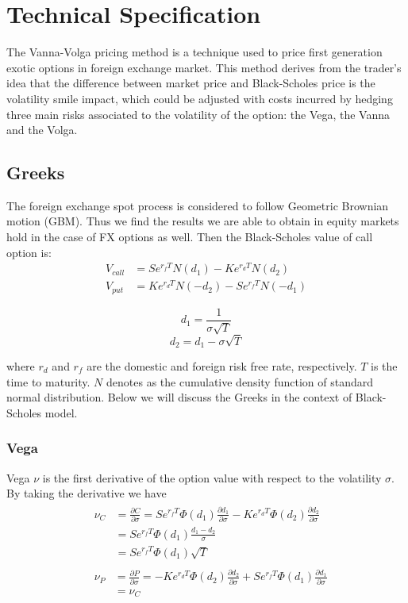 \chapter{Technical Specification}

The Vanna-Volga pricing method is a technique used to price first generation exotic options in foreign exchange market. This method derives from the trader's idea that the difference between market price and Black-Scholes price is the volatility smile impact, which could be adjusted with costs incurred by hedging three main risks associated to the volatility of the option: the Vega, the Vanna and the Volga.

\section{Greeks} 
The foreign exchange spot process is considered to follow Geometric Brownian motion (GBM). Thus we find the results we are able to obtain in equity markets hold in the case of FX options as well. \newline
Then the Black-Scholes value of call option is:
\begin{align}
V_{call} &= Se^{r_fT}N(d_1) - Ke^{r_dT}N(d_2) \\
V_{put} &=  Ke^{r_dT}N(-d_2) - Se^{r_fT}N(-d_1)
\end{align}

\[d_1 = \frac{1}{\sigma\sqrt{T}}\]
\[d_2 = d_1 - \sigma \sqrt{T}\]

where $r_d$ and $r_f$ are the domestic and foreign risk free rate, respectively. $T$ is the time to maturity. $N$ denotes as the cumulative density function of standard normal distribution. Below we will discuss the Greeks in the context of Black-Scholes model.

\subsection{Vega}
Vega $\nu$ is the first derivative of the option value with respect to the volatility $\sigma$. \newline
By taking the derivative we have
\begin{align}
&\begin{aligned}
\nu_C &=\frac{\partial C}{\partial \sigma} = Se^{r_fT}\varPhi(d_1)\frac{\partial d_1}{\partial \sigma}-Ke^{r_dT}\varPhi(d_2)\frac{\partial d_2}{\partial \sigma}\\
&= Se^{r_fT}\varPhi(d_1)\frac{d_1 - d_2}{\sigma} \\
&=  Se^{r_fT}\varPhi(d_1)\sqrt{T}
\end{aligned} \\
&\begin{aligned}
\nu_P &=\frac{\partial P}{\partial \sigma} =-Ke^{r_dT}\varPhi(d_2)\frac{\partial d_2}{\partial \sigma} + Se^{r_fT}\varPhi(d_1)\frac{\partial d_1}{\partial \sigma}\\
&= \nu_C 
\end{aligned}
\end{align}

